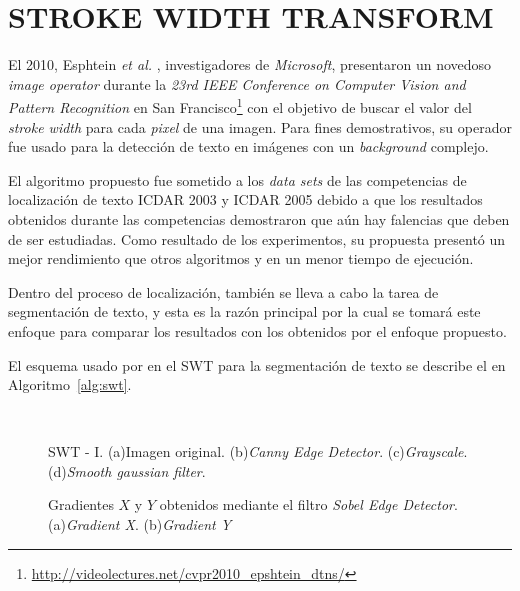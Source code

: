 \chapter{STROKE WIDTH TRANSFORM}
\label{cap-swt}
El 2010, Esphtein \textit{et al.} \cite{Epshtein:SWT:2010}, investigadores de 
\textit{Microsoft}, presentaron un novedoso \textit{image operator} durante la
\textit{23rd IEEE Conference on Computer Vision and Pattern Recognition} en San
Francisco\footnote{\url{http://videolectures.net/cvpr2010_epshtein_dtns/}} con
el objetivo de buscar el valor del \textit{stroke width} para cada
\textit{pixel} de una imagen. Para fines demostrativos, su operador fue usado
para la detección de texto en imágenes con un \textit{background} complejo. 

El algoritmo propuesto fue sometido a los \textit{data sets} de las 
competencias de localización de texto ICDAR 2003 y ICDAR 2005\cite{ICDAR:web}
debido a que los resultados obtenidos durante las competencias demostraron que
aún hay falencias que deben de ser estudiadas. Como resultado de los
experimentos, su propuesta presentó un mejor rendimiento que otros algoritmos 
y en un menor tiempo de ejecución.

Dentro del proceso de localización, también se lleva a cabo la tarea de 
segmentación de texto, y esta es la razón principal por la cual se tomará este
enfoque para comparar los resultados con los obtenidos por el enfoque propuesto.

El esquema usado por en el SWT para la segmentación de texto se describe el en 
Algoritmo~\ref{alg:swt}.


\clearpage
\begin{figure}
	\setlength{\fboxsep}{0pt}
   \\
   { }
	\caption[SWT - I]{SWT - I. (a)Imagen original. (b)\textit{Canny Edge 
	Detector}. (c)\textit{Grayscale}. (d)\textit{Smooth gaussian filter}.}
	\label{Fig:cap-swt:paso01}
\end{figure}

\begin{figure}
  \caption[SWT - II]{Gradientes $X$ y $Y$ obtenidos mediante el filtro 
  \textit{Sobel Edge Detector}. (a)\textit{Gradient X}. (b)\textit{Gradient Y}}
  \label{Fig:cap-swt:paso02}
\end{figure}

